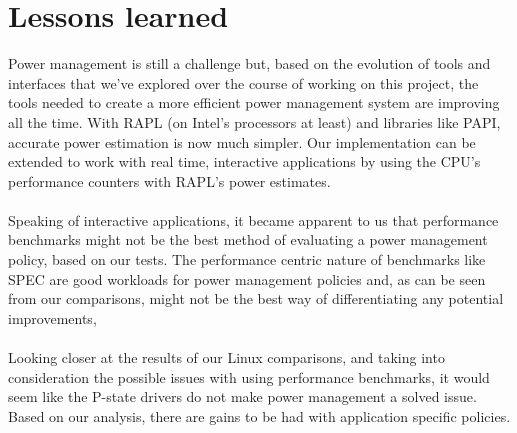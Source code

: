 \section{Lessons learned}\label{sec:disc}

Power management is still a challenge but, based on the evolution of tools and interfaces that we've explored 
over the course of working on this project, the tools needed to create a more efficient power management system 
are improving all the time. With RAPL (on Intel's processors at least) and libraries like PAPI, accurate power 
estimation is now much simpler. Our implementation can be extended to work with real time, interactive applications 
by using the CPU's performance counters with RAPL's power estimates.

\paragraph{}Speaking of interactive applications, it became apparent to us that performance benchmarks might not be the best method  
of evaluating a power management policy, based on our tests. The performance centric nature of benchmarks like SPEC 
are good workloads for power management policies and, as can be seen from our comparisons, might not be the best way 
of differentiating any potential improvements,

\paragraph{} Looking closer at the results of our Linux comparisons, and taking into consideration the possible issues 
with using performance benchmarks, it would seem like the P-state drivers do not make power management a solved issue. 
Based on our analysis, there are gains to be had with application specific policies.
